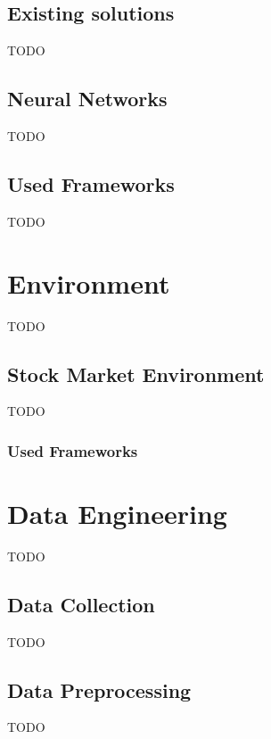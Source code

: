 \section{Existing solutions}\label{sec:existing-solutions}
TODO


\section{Neural Networks}\label{sec:neural-networks}
TODO


\section{Used Frameworks}\label{sec:used-frameworks}
TODO



\chapter{Environment}\label{ch:environment}
TODO


\section{Stock Market Environment}\label{sec:stock-market-environment}
TODO

\subsection{Used Frameworks}\label{subsec:used-frameworks}




\chapter{Data Engineering}\label{ch:data-engineering}
TODO


\section{Data Collection}\label{sec:data-collection}
TODO


\section{Data Preprocessing}\label{sec:data-preprocessing}
TODO


